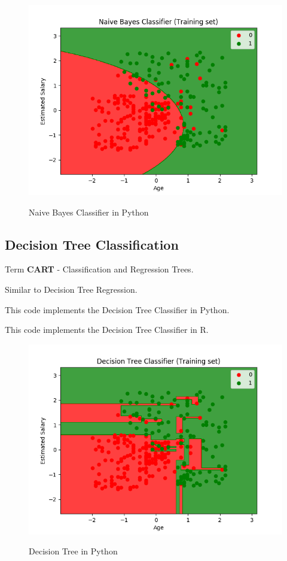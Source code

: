 \documentclass[runningheads,a4paper]{llncs}
\begin{document}
\begin{figure}[H]
\centering
\begin{center}
\includegraphics[scale=0.8]{pics/bayes}
\label{uloha1:pic1}
\caption{Naive Bayes Classifier in Python} 
\end{center}
\end{figure}

\subsection{Decision Tree Classification}

Term \textbf{CART} - Classification and Regression Trees.

Similar to Decision Tree Regression.  

This code implements the Decision Tree Classifier in Python.
 


This code implements the Decision Tree Classifier in R.
 

\begin{figure}[H]
\centering
\begin{center}
\includegraphics[scale=0.8]{pics/dtc}
\label{uloha1:pic1}
\caption{Decision Tree in Python} 
\end{center}
\end{figure}
\end{document}

